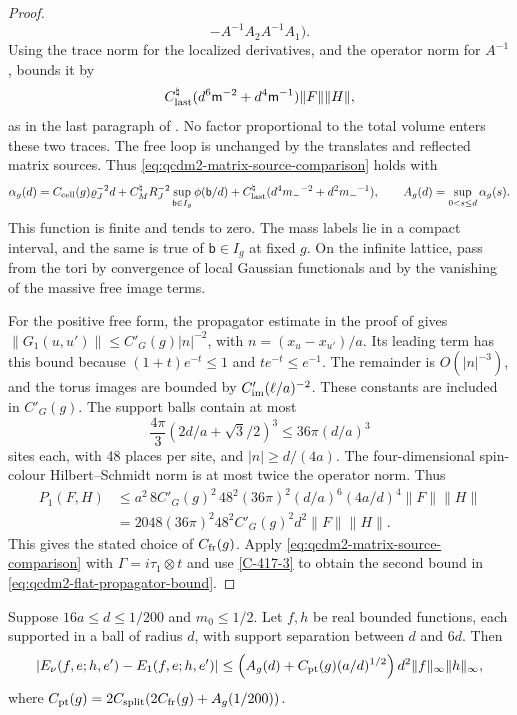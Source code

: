 \documentclass[11pt,letterpaper,reqno]{amsart}
\makeatletter
\theoremstyle{definition}
\newcommand{\ms@majorstart}{%
  \pushQED{\qed}\renewcommand{\qedsymbol}{$\blacksquare\square$}}
\newenvironment{theorem}[1][]{\ms@majorstart\ms@theorem[#1]}
  {\popQED\endms@theorem}
\theoremstyle{remark}
\makeatother
\begin{document}
\begin{proof}
\[                      -A^{-1}A_2A^{-1}A_1).
\]
Using the trace norm for the localized derivatives,
and the operator norm for $A^{-1}$, bounds it by
\[
 C_{\rm last}^\natural
          (d^6\mathsf m^{-2}+d^4\mathsf m^{-1})\|F\|\|H\|,
\]
as in the last paragraph of \cite[Lem. 11.5]{QCDM1}.
No factor proportional to the total volume enters
these two traces.
The free loop is unchanged by the translates and reflected
matrix sources.  Thus \eqref{eq:qcdm2-matrix-source-comparison}
holds with
\[
 \alpha_g(d)=C_{\rm cell}(g)\varrho_J^{-2}d
       +C_M^\natural R_J^{-2}
                 \sup_{\mathsf b\in I_g}\phi(\mathsf b/d)
       +C_{\rm last}^\natural
                    (d^4{m_-}^{-2}+d^2{m_-}^{-1}),
 \qquad A_g(d)=\sup_{0<s\le d}\alpha_g(s).
\]
This function is finite and tends to zero.  The mass
labels lie in a compact interval, and the same is true
of $\mathsf b\in I_g$ at fixed $g$.
On the infinite lattice, pass from the tori by convergence
of local Gaussian functionals and by the vanishing of
the massive free image terms.

For the positive free form, the propagator estimate
in the proof of \cite[Lem. 11.5]{QCDM1} gives
$\|G_1(u,u')\|\le C'_G(g)|n|^{-2}$, with
$n=(x_u-x_{u'})/a$. Its leading term has this bound
because $(1+t)e^{-t}\le1$ and $te^{-t}\le e^{-1}$.
The remainder is $O(|n|^{-3})$, and the torus images
are bounded by $C'_{\rm im}(\ell/a)^{-2}$.
These constants are included in $C'_G(g)$.
The support balls contain at most
\[
 \frac{4\pi}{3}(2d/a+\sqrt3/2)^3
       \le36\pi(d/a)^3
\]
sites each, with 48 places per site, and
$|n|\ge d/(4a)$. The four-dimensional spin-colour
Hilbert--Schmidt norm is at most twice the operator
norm. Thus
\begin{align*}
 P_1(F,H)
 &\le a^2\,8C'_G(g)^2\,48^2(36\pi)^2
        (d/a)^6(4a/d)^4\|F\|\|H\|\\
 &=2048(36\pi)^2 48^2C'_G(g)^2d^2\|F\|\|H\|.
\end{align*}
This gives the stated choice of $C_{\rm fr}(g)$.
Apply \eqref{eq:qcdm2-matrix-source-comparison} with
$\Gamma=i\tau_1\otimes t$ and use \cref{C-417-3} to obtain
the second bound in \eqref{eq:qcdm2-flat-propagator-bound}.
\end{proof}

\begin{theorem}[Comparison with the free current loop]\label{C-417-9}
Suppose $16a\le d\le1/200$ and $m_0\le1/2$.
Let $f,h$ be real bounded
functions, each supported in a ball of radius $d$, with
support separation between $d$ and $6d$.  Then
\begin{equation}\label{eq:qcdm2-current-comparison}
 |E_\nu(f,e;h,e')-E_1(f,e;h,e')|
 \le\left(A_g(d)+C_{\rm pt}(g)(a/d)^{1/2}\right)
                                   d^2\|f\|_\infty\|h\|_\infty,
\end{equation}
where
$C_{\rm pt}(g)=2C_{\rm split}(2C_{\rm fr}(g)+A_g(1/200))$.
\end{theorem}
\end{document}
